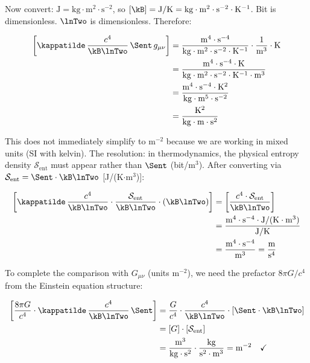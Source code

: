 \noindent Now convert: $\mathrm{J} = \mathrm{kg}\cdot\mathrm{m}^2
\cdot\mathrm{s}^{-2}$, so $[\kB] = \mathrm{J/K} =
\mathrm{kg}\cdot\mathrm{m}^2\cdot\mathrm{s}^{-2}\cdot\mathrm{K}^{-1}$.
Bit is dimensionless. $\lnTwo$ is dimensionless. Therefore:

\begin{align}
    \left[\kappatilde\,\frac{c^4}{\kB\lnTwo}\,\Sent\,g_{\mu\nu}\right]
    &= \frac{\mathrm{m}^4\cdot\mathrm{s}^{-4}}
    {\mathrm{kg}\cdot\mathrm{m}^2\cdot\mathrm{s}^{-2}\cdot\mathrm{K}^{-1}}
    \cdot\frac{1}{\mathrm{m}^3}
    \cdot\mathrm{K} \nonumber \\
    &= \frac{\mathrm{m}^4\cdot\mathrm{s}^{-4}\cdot\mathrm{K}}
    {\mathrm{kg}\cdot\mathrm{m}^2\cdot\mathrm{s}^{-2}
    \cdot\mathrm{K}^{-1}\cdot\mathrm{m}^3} \nonumber \\
    &= \frac{\mathrm{m}^4\cdot\mathrm{s}^{-4}\cdot\mathrm{K}^2}
    {\mathrm{kg}\cdot\mathrm{m}^5\cdot\mathrm{s}^{-2}}
    \nonumber \\
    &= \frac{\mathrm{K}^2}{\mathrm{kg}\cdot\mathrm{m}\cdot\mathrm{s}^{2}}
    \label{eq:dim_second_term_end}
\end{align}

\noindent This does not immediately simplify to m$^{-2}$ because we are
working in mixed units (SI with kelvin). The resolution: in thermodynamics,
the physical entropy density $\mathcal{S}_{\mathrm{ent}}$ must appear
rather than $\Sent$ (bit/m$^3$). After converting via
$\mathcal{S}_{\mathrm{ent}} = \Sent\cdot\kB\lnTwo$ [J/(K$\cdot$m$^3$)]:

\begin{align}
    \left[\kappatilde\,\frac{c^4}{\kB\lnTwo}
    \cdot\frac{\mathcal{S}_{\mathrm{ent}}}{\kB\lnTwo}
    \cdot(\kB\lnTwo)\right]
    &= \left[\frac{c^4\cdot\mathcal{S}_{\mathrm{ent}}}
    {\kB\lnTwo}\right] \nonumber \\
    &= \frac{\mathrm{m}^4\cdot\mathrm{s}^{-4}\cdot
    \mathrm{J}/(\mathrm{K}\cdot\mathrm{m}^3)}
    {\mathrm{J}/\mathrm{K}} \nonumber \\
    &= \frac{\mathrm{m}^4\cdot\mathrm{s}^{-4}}{\mathrm{m}^3}
    = \frac{\mathrm{m}}{\mathrm{s}^4}
    \label{eq:dim_second_partial}
\end{align}

To complete the comparison with $G_{\mu\nu}$ (units m$^{-2}$), we need the
prefactor $8\pi G/c^4$ from the Einstein equation structure:

\begin{align}
    \left[\frac{8\pi G}{c^4}\cdot\kappatilde\,\frac{c^4}{\kB\lnTwo}
    \,\Sent\right]
    &= \frac{G}{c^4}\cdot\frac{c^4}{\kB\lnTwo}\cdot[\Sent\cdot\kB\lnTwo]
    \nonumber \\
    &= [G]\cdot[\mathcal{S}_{\mathrm{ent}}] \nonumber \\
    &= \frac{\mathrm{m}^3}{\mathrm{kg}\cdot\mathrm{s}^2}
    \cdot\frac{\mathrm{kg}}{\mathrm{s}^2\cdot\mathrm{m}^3}
    = \mathrm{m}^{-2} \quad \checkmark
    \label{eq:dim_second_term_final}
\end{align}

